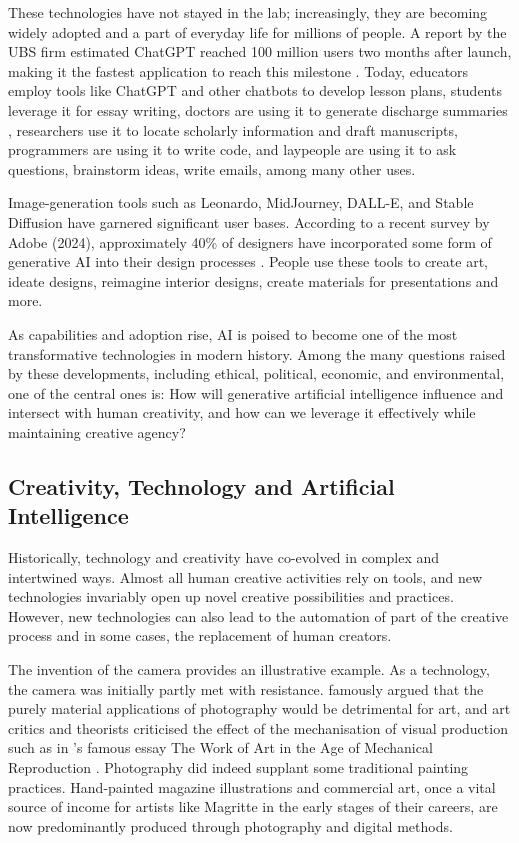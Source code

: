 These technologies have not stayed in the lab; increasingly, they are becoming widely adopted and a part of everyday life for millions of people. A report by the UBS firm estimated ChatGPT reached 100 million users two months after launch, making it the fastest application to reach this milestone \citep{Hu2023-ie}. Today, educators employ tools like ChatGPT and other chatbots to develop lesson plans, students leverage it for essay writing, doctors are using it to generate discharge summaries \citep{Patel2023-fg}, researchers use it to locate scholarly information and draft manuscripts, programmers are using it to write code, and laypeople are using it to ask questions, brainstorm ideas, write emails, among many other uses. 

Image-generation tools such as Leonardo, MidJourney, DALL-E, and Stable Diffusion have garnered significant user bases. According to a recent survey by Adobe (2024), approximately 40\% of designers have incorporated some form of generative AI into their design processes \citep{Offerman2024-lf}. People use these tools to create art, ideate designs, reimagine interior designs, create materials for presentations and more. 

As capabilities and adoption rise, AI is poised to become one of the most transformative technologies in modern history. Among the many questions raised by these developments, including ethical, political, economic, and environmental, one of the central ones is: How will generative artificial intelligence influence and intersect with human creativity, and how can we leverage it effectively while maintaining creative agency?

\subsection{Creativity, Technology and Artificial Intelligence}

Historically, technology and creativity have co-evolved in complex and intertwined ways. Almost all human creative activities rely on tools, and new technologies invariably open up novel creative possibilities and practices. However, new technologies can also lead to the automation of part of the creative process and in some cases, the replacement of human creators.

The invention of the camera provides an illustrative example. As a technology, the camera was initially partly met with resistance. \citet{Baudelaire1955-ae} famously argued that the purely material applications of photography would be detrimental for art, and art critics and theorists criticised the effect of the mechanisation of visual production such as in \citeauthor{Benjamin1935-wd}'s famous essay The Work of Art in the Age of Mechanical Reproduction \citep{Benjamin1935-wd}. Photography did indeed supplant some traditional painting practices. Hand-painted magazine illustrations and commercial art, once a vital source of income for artists like Magritte in the early stages of their careers, are now predominantly produced through photography and digital methods. 

